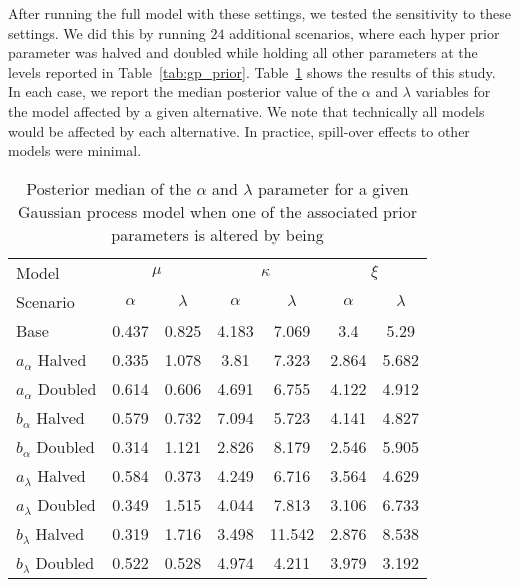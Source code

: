 \documentclass[11pt,english]{article}
\begin{document}
After running the full model with these settings, we tested the sensitivity to these settings.  We did this by running $24$ additional scenarios, where each hyper prior parameter was halved and doubled while holding all other parameters at the levels reported in Table~\ref{tab:gp_prior}.  Table~\ref{tab:gp_prior_median} shows the results of this study.  In each case, we report the median posterior value of the $\alpha$ and $\lambda$ variables for the model affected by a given alternative.  We note that technically all models would be affected by each alternative.  In practice, spill-over effects to other models were minimal.

\begin{table}[htp]\caption{Posterior median of the $\alpha$ and $\lambda$ parameter for a given Gaussian process model when one of the associated prior parameters is altered by being}\label{tab:gp_prior_median}
\begin{center}
\begin{tabular}{l|cc|cc|cc|}
\hline\hline
Model&\multicolumn{2}{c|}{$\mu$}&\multicolumn{2}{c|}{$\kappa$}&\multicolumn{2}{c|}{$\xi$}\\
Scenario& $\alpha$ & $\lambda$ & $\alpha$ & $\lambda$ & $\alpha$ & $\lambda$\\
\hline
Base & 0.437 & 0.825 & 4.183 & 7.069 & 3.4 & 5.29\\
$a_\alpha$ Halved & 0.335 & 1.078 & 3.81 & 7.323 & 2.864 & 5.682\\
$a_\alpha$ Doubled & 0.614 & 0.606 & 4.691 & 6.755 & 4.122 & 4.912\\
$b_\alpha$ Halved & 0.579 & 0.732 & 7.094 & 5.723 & 4.141 & 4.827\\
$b_\alpha$ Doubled & 0.314 & 1.121 & 2.826 & 8.179 & 2.546 & 5.905\\
$a_\lambda$ Halved & 0.584 & 0.373 & 4.249 & 6.716 & 3.564 & 4.629\\
$a_\lambda$ Doubled & 0.349 & 1.515 & 4.044 & 7.813 & 3.106 & 6.733\\
$b_\lambda$ Halved & 0.319 & 1.716 & 3.498 & 11.542 & 2.876 & 8.538\\
$b_\lambda$ Doubled & 0.522 & 0.528 & 4.974 & 4.211 & 3.979 & 3.192\\
\hline\hline
\end{tabular}
\end{center}
\end{table}
\end{document}
